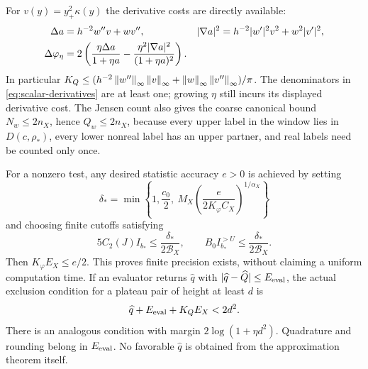 For $v(y)=y_+^2\kappa(y)$ the derivative costs are directly available:
\begin{align}
 \Delta a&=h^{-2}w''v+wv'',&
 |\nabla a|^2&=h^{-2}|w'|^2v^2+w^2|v'|^2,\label{eq:scalar-derivatives}\\
 \Delta\varphi_\eta&=
 2\left(\frac{\eta\Delta a}{1+\eta a}
              -\frac{\eta^2|\nabla a|^2}{(1+\eta a)^2}\right).
 \notag
\end{align}
In particular $K_Q\le(h^{-2}\left\|w''\right\|_\infty\left\|v\right\|_\infty+
\left\|w\right\|_\infty\left\|v''\right\|_\infty)/\pi$.
The denominators in \eqref{eq:scalar-derivatives} are at least one;
growing $\eta$ still incurs its displayed derivative cost.
The Jensen count also gives the coarse canonical bound
$N_w\le2n_X$, hence $Q_w\le2n_X$, because every upper label in
the window lies in $D(c,\rho_*)$, every lower nonreal label has an
upper partner, and real labels need be counted only once.

For a nonzero test, any desired statistic accuracy $e>0$ is achieved
by setting
\begin{equation}\label{eq:precision-choice}
 \delta_*=\min\left\{1,\frac{c_0}2,\
    M_X\left(\frac{e}{2K_\varphi C_X}\right)^{1/\alpha_X}\right\}
\end{equation}
and choosing finite cutoffs satisfying
\begin{equation}\label{eq:tail-allocation}
 5C_2(J)I_{b_*}\le\frac{\delta_*}{2\mathcal B_X},
 \qquad B_0I_{b_*}^{>U}\le\frac{\delta_*}{2\mathcal B_X}.
\end{equation}
Then $K_\varphi E_X\le e/2$. This proves finite precision exists,
without claiming a uniform computation time. If an evaluator returns
$\widehat q$ with $|\widehat q-\widehat Q|\le E_{\rm eval}$,
the actual exclusion condition for a plateau pair of height at least
$d$ is
\begin{equation}\label{eq:scalar-consumer}
 \widehat q+E_{\rm eval}+K_QE_X<2d^2 .
\end{equation}
There is an analogous condition with margin
$2\log(1+\eta d^2)$. Quadrature and rounding belong in
$E_{\rm eval}$. No favorable $\widehat q$ is obtained from the
approximation theorem itself.
